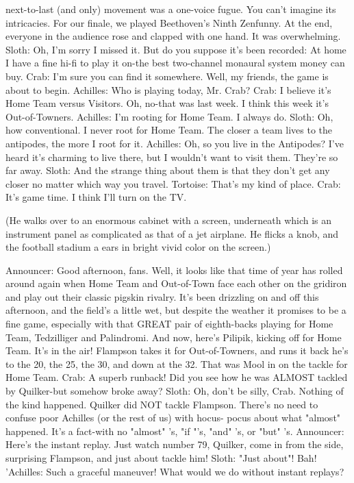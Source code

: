    next-to-last (and only) movement was a one-voice fugue. You can't imagine its
   intricacies. For our finale, we played Beethoven's Ninth Zenfunny. At the end,
   everyone in the audience rose and clapped with one hand. It was overwhelming.
Sloth: Oh, I'm sorry I missed it. But do you suppose it's been recorded: At home I have a
   fine hi-fi to play it on-the best two-channel monaural system money can buy.
Crab: I'm sure you can find it somewhere. Well, my friends, the game is about to begin.
Achilles: Who is playing today, Mr. Crab?
Crab: I believe it's Home Team versus Visitors. Oh, no-that was last week. I think this
   week it's Out-of-Towners.
Achilles: I'm rooting for Home Team. I always do.
Sloth: Oh, how conventional. I never root for Home Team. The closer a team lives to the
   antipodes, the more I root for it.
Achilles: Oh, so you live in the Antipodes? I've heard it's charming to live there, but I
   wouldn't want to visit them. They're so far away.
Sloth: And the strange thing about them is that they don't get any closer no matter which
   way you travel.
Tortoise: That's my kind of place.
Crab: It's game time. I think I'll turn on the TV.

   (He walks over to an enormous cabinet with a screen, underneath which is an
   instrument panel as complicated as that of a jet airplane. He flicks a knob, and the
   football stadium a ears in bright vivid color on the screen.)

Announcer: Good afternoon, fans. Well, it looks like that time of year has rolled around
   again when Home Team and Out-of-Town face each other on the gridiron and play out
   their classic pigskin rivalry. It's been drizzling on and off this afternoon, and the field's
   a little wet, but despite the weather it promises to be a fine game, especially with that
   GREAT pair of eighth-backs playing for Home Team, Tedzilliger and Palindromi.
   And now, here's Pilipik, kicking off for Home Team. It's in the air! Flampson takes it
   for Out-of-Towners, and runs it back he's to the 20, the 25, the 30, and down at the 32.
   That was Mool in on the tackle for Home Team.
Crab: A superb runback! Did you see how he was ALMOST tackled by Quilker-but
   somehow broke away?
Sloth: Oh, don't be silly, Crab. Nothing of the kind happened. Quilker did NOT tackle
   Flampson. There's no need to confuse poor Achilles (or the rest of us) with hocus-
   pocus about what "almost" happened. It's a fact-with no "almost" 's, "if "'s, "and" 's, or
   "but" 's.
Announcer: Here's the instant replay. Just watch number 79, Quilker, come in from the
   side, surprising Flampson, and just about tackle him!
Sloth: "Just about"! Bah!
'Achilles: Such a graceful maneuver! What would we do without instant replays?




